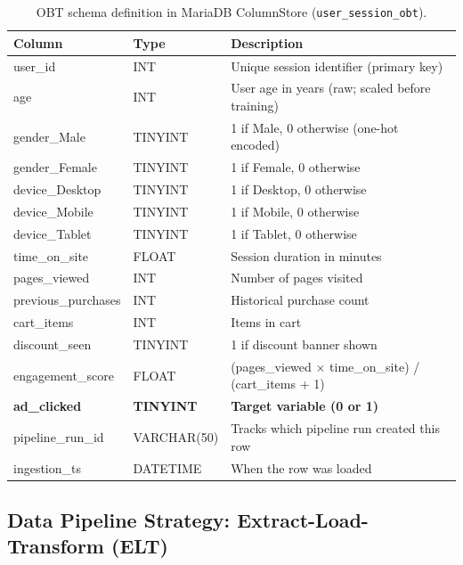 \documentclass[12pt,a4paper]{article}
\begin{document}
\begin{table}[H]
\centering
\caption{OBT schema definition in MariaDB ColumnStore (\texttt{user\_session\_obt}).}
\label{tab:obt_schema}
\footnotesize
\renewcommand{\arraystretch}{1.3}
\begin{tabularx}{\textwidth}{|L{3.2cm}|C{1.8cm}|Y|}
\hline
\textbf{Column} & \textbf{Type} & \textbf{Description} \\
\hline
user\_id             & INT          & Unique session identifier (primary key) \\
\hline
age                  & INT          & User age in years (raw; scaled before training) \\
\hline
gender\_Male         & TINYINT      & 1 if Male, 0 otherwise (one-hot encoded) \\
\hline
gender\_Female       & TINYINT      & 1 if Female, 0 otherwise \\
\hline
device\_Desktop      & TINYINT      & 1 if Desktop, 0 otherwise \\
\hline
device\_Mobile       & TINYINT      & 1 if Mobile, 0 otherwise \\
\hline
device\_Tablet       & TINYINT      & 1 if Tablet, 0 otherwise \\
\hline
time\_on\_site       & FLOAT        & Session duration in minutes \\
\hline
pages\_viewed        & INT          & Number of pages visited \\
\hline
previous\_purchases  & INT          & Historical purchase count \\
\hline
cart\_items          & INT          & Items in cart \\
\hline
discount\_seen       & TINYINT      & 1 if discount banner shown \\
\hline
engagement\_score    & FLOAT        & (pages\_viewed $\times$ time\_on\_site) / (cart\_items + 1) \\
\hline
\textbf{ad\_clicked} & \textbf{TINYINT} & \textbf{Target variable (0 or 1)} \\
\hline
pipeline\_run\_id    & VARCHAR(50)  & Tracks which pipeline run created this row \\
\hline
ingestion\_ts        & DATETIME     & When the row was loaded \\
\hline
\end{tabularx}
\end{table}

\subsection{Data Pipeline Strategy: Extract-Load-Transform (ELT)}
\end{document}
